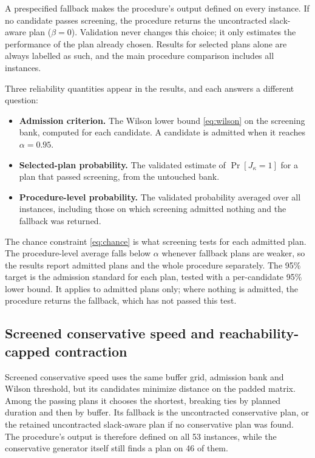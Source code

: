 \documentclass[11pt,a4paper]{article}
\begin{document}
A prespecified fallback makes the procedure's output defined on every instance.
If no candidate passes screening, the procedure returns the uncontracted
slack-aware plan ($\beta=0$). Validation never changes this choice; it only
estimates the performance of the plan already chosen. Results for selected plans alone are always labelled as such, and
the main procedure comparison includes all instances.

Three reliability quantities appear in the results, and each answers a different
question:
\begin{itemize}
  \item[$\bullet$] \textbf{Admission criterion.} The Wilson lower bound \eqref{eq:wilson} on
        the screening bank, computed for each candidate. A candidate is admitted
        when it reaches $\alpha=0.95$.
  \item[$\bullet$] \textbf{Selected-plan probability.} The validated estimate of
        $\Pr[J_\kappa=1]$ for a plan that passed screening, from the untouched
        bank.
  \item[$\bullet$] \textbf{Procedure-level probability.} The validated probability averaged
        over all instances, including those on which screening admitted nothing
        and the fallback was returned.
\end{itemize}
The chance constraint \eqref{eq:chance} is what screening tests for each
admitted plan. The procedure-level average falls below $\alpha$ whenever fallback
plans are weaker, so the results report admitted plans and the whole procedure
separately. The 95\% target is the admission standard for each plan, tested
with a per-candidate 95\% lower bound. It applies to admitted plans only; where
nothing is admitted, the procedure returns the fallback, which has not passed
this test.

\subsection{Screened conservative speed and reachability-capped contraction}\label{sec:capping}

Screened conservative speed uses the same buffer grid, admission bank and
Wilson threshold, but its candidates minimize distance on the padded matrix.
Among the passing plans it chooses the shortest, breaking ties by planned
duration and then by buffer. Its fallback is the uncontracted conservative plan,
or the retained uncontracted slack-aware plan if no conservative plan was found.
The procedure's output is therefore defined on all 53 instances, while the
conservative generator itself still finds a plan on 46 of them.
\end{document}
